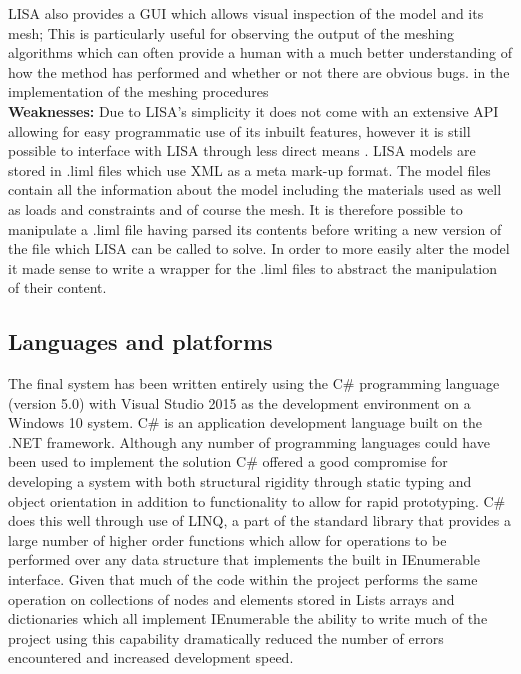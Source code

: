 \noindent
LISA also provides a GUI which allows visual inspection of the model and its mesh; This is particularly useful for observing the output of the meshing algorithms which can often provide a human with a much better understanding of how the method has performed and whether or not there are obvious bugs. in the implementation of the meshing procedures \\ 

\noindent
\textbf{Weaknesses: } Due to LISA’s simplicity it does not come with an extensive API allowing for easy programmatic use of its inbuilt features, however it is still possible to interface with LISA through less direct means \cite{LISAManual}. LISA models are stored in .liml files which use XML as a meta mark-up format. The model files contain all the information about the model including the materials used as well as loads and constraints and of course the mesh. It is therefore possible to manipulate a .liml file having parsed its contents before writing a new version of the file which LISA can be called to solve. In order to more easily alter the model it made sense to write a wrapper  for the .liml files to abstract the manipulation of their content.

\subsection{Languages and platforms}
The final system has been written entirely using the C\# programming language (version 5.0) with Visual Studio 2015 as the development environment on a Windows 10 system. C\# is an application development language built on the .NET framework. Although any number of programming languages could have been used to implement the solution C\# offered a good compromise for developing a system with both structural rigidity through static typing and object orientation in addition to functionality to allow for rapid prototyping. C\# does this well through use of LINQ, a part of the standard library that provides a large number of higher order functions which allow for operations to be performed over any data structure that implements the built in IEnumerable interface. Given that much of the code within the project performs the same operation on collections of nodes and elements stored in Lists arrays and dictionaries which all implement IEnumerable the ability to write much of the project using this capability dramatically reduced the number of errors encountered and increased development speed.


